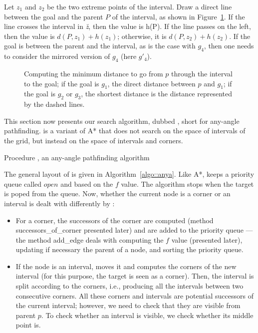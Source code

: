 Let $z_1$ and $z_2$ be the two extreme points of the interval.  
Draw a direct line between the goal and the parent $P$ of the interval, 
as shown in Figure~\ref{fig::fvalue}.  
If the line crosses the interval in \textit{\u z}, then the value is h(P).  If the line passes on the left, 
then the value is $d(P,z_1)+h(z_1)$; 
otherwise, it is $d(P,z_2)+h(z_2)$.  
If the goal is between the parent and the interval, 
as is the case with $g_4$, 
then one needs to consider the mirrored version of $g_4$ 
(here $g'_4$).  

\begin{figure}[ht]
  \begin{center}
    
  \end{center}
  \caption{Computing the minimum distance 
    to go from $p$ through the interval to the goal; 
    if the goal is $g_1$, the direct distance between $p$ and $g_1$; 
    if the goal is $g_2$ or $g_3$, 
    the shortest distance is the distance represented by the dashed lines.}
  \label{fig::fvalue}
\end{figure}

This section now presents our search algorithm, dubbed \anya, short for
any-angle pathfinding.  \anya{} is a variant of A* that does not search on the
space of intervals of the grid, but instead on the space of intervals and
corners.

\begin{algorithm}[ht!]
  
  \caption{Procedure \anya, an any-angle pathfinding algorithm}
  \label{algo::anya}
\end{algorithm}

The general layout of \anya{} is given in Algorithm~\ref{algo::anya}.  
Like A*, \anya{} keeps a priority queue called $open$ 
and based on the $f$ value.  
The algorithm stops when the target is poped from the queue.  
Now, whether the current node is a corner or an interval 
is dealt with differently by \anya: 
\begin{itemize}
\item 
  For a corner, the successors of the corner are computed 
  (method successors\_of\_corner presented later) 
  and are added to the priority queue --- 
  the method add\_edge deals with computing the $f$ value 
  (presented later), updating if necessary the parent of a node, 
  and sorting the priority queue.  
\item 
  If the node is an interval, \anya{} moves it 
  and computes the corners of the new interval 
  (for this purpose, the target is seen as a corner).  
  Then, the interval is split according to the corners, 
  i.e., producing all the intervals between two consecutive corners.  
  All these corners and intervals 
  are potential successors of the current interval; 
  however, we need to check that they are visible from parent $p$.  
  To check whether an interval is visible, 
  we check whether its middle point is.  
\end{itemize}

